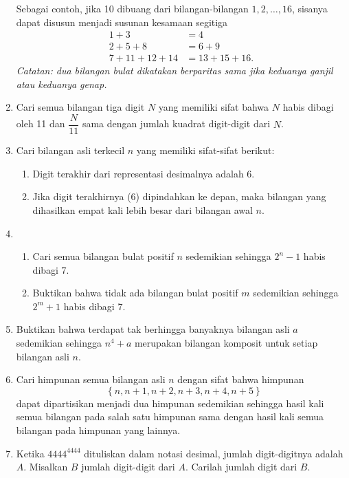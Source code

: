 \documentclass[12pt]{article}
\newcommand*\lrbr[1]{\mathop{}\!\left\lbrace#1\right\rbrace}
\begin{document}
\begin{enumerate}[leftmargin=*]
		\par \noindent Sebagai contoh, jika 10 dibuang dari bilangan-bilangan $ 1, 2, \dots, 16 $, sisanya dapat disusun menjadi susunan kesamaan segitiga
		\begin{align*}
			1 + 3 &= 4 \\
			2 + 5 + 8 &= 6 + 9 \\
			7 + 11 + 12 + 14 &= 13 + 15 + 16.
		\end{align*}
		\textit{Catatan: dua bilangan bulat dikatakan berparitas sama jika keduanya ganjil atau keduanya genap.}
		
		
		
		
		
		\item Cari semua bilangan tiga digit $ N $ yang memiliki sifat bahwa $ N $ habis dibagi oleh 11 dan $ \dfrac{N}{11} $ sama dengan jumlah kuadrat digit-digit dari $ N $.
		\item Cari bilangan asli terkecil $ n $ yang memiliki sifat-sifat berikut:
		\begin{enumerate}
			\item Digit terakhir dari representasi desimalnya adalah 6.
			\item Jika digit terakhirnya (6) dipindahkan ke depan, maka bilangan yang dihasilkan empat kali lebih besar dari bilangan awal $ n $.
		\end{enumerate}
		\item
		\begin{enumerate}
			\item Cari semua bilangan bulat positif $ n $ sedemikian sehingga $ 2^{n} - 1 $ habis dibagi 7.
			\item Buktikan bahwa tidak ada bilangan bulat positif $ m $ sedemikian sehingga $ 2^{m} + 1 $ habis dibagi 7.
		\end{enumerate}
		\item Buktikan bahwa terdapat tak berhingga banyaknya bilangan asli $ a $ sedemikian sehingga $ n^{4} + a $ merupakan bilangan komposit untuk setiap bilangan asli $ n $.
		\item Cari himpunan semua bilangan asli $ n $ dengan sifat bahwa himpunan
		\[ \lrbr{n, n + 1, n + 2, n + 3, n + 4, n + 5} \]
		dapat dipartisikan menjadi dua himpunan sedemikian sehingga hasil kali semua bilangan pada salah satu himpunan sama dengan hasil kali semua bilangan pada himpunan yang lainnya.
		\item Ketika $ 4444^{4444} $ dituliskan dalam notasi desimal, jumlah digit-digitnya adalah $ A $. Misalkan $ B $ jumlah digit-digit dari $ A $. Carilah jumlah digit dari $ B $.

\end{enumerate}
\end{document}
